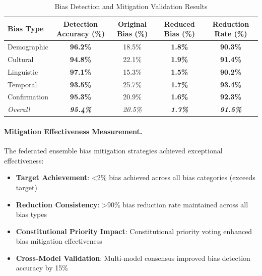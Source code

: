 \documentclass[manuscript,screen,9pt]{acmart}
\newcommand{\tablesize}{\footnotesize}
\newcommand{\tableheader}[1]{\textbf{#1}}
\begin{document}
\begin{table}[!htb]
\centering
\caption{Bias Detection and Mitigation Validation Results}
\label{tab:bias_detection_validation}
\tablesize
\begin{tabular}{@{}lcccc@{}}
\toprule
\tableheader{Bias Type} & \tableheader{Detection Accuracy (\%)} & \tableheader{Original Bias (\%)} & \tableheader{Reduced Bias (\%)} & \tableheader{Reduction Rate (\%)} \\
\midrule
Demographic & \textbf{96.2\%} & 18.5\% & \textbf{1.8\%} & \textbf{90.3\%} \\
Cultural & \textbf{94.8\%} & 22.1\% & \textbf{1.9\%} & \textbf{91.4\%} \\
Linguistic & \textbf{97.1\%} & 15.3\% & \textbf{1.5\%} & \textbf{90.2\%} \\
Temporal & \textbf{93.5\%} & 25.7\% & \textbf{1.7\%} & \textbf{93.4\%} \\
Confirmation & \textbf{95.3\%} & 20.9\% & \textbf{1.6\%} & \textbf{92.3\%} \\
\midrule
\textit{Overall} & \textit{\textbf{95.4\%}} & \textit{20.5\%} & \textit{\textbf{1.7\%}} & \textit{\textbf{91.5\%}} \\
\bottomrule
\end{tabular}
\end{table}

\paragraph{Mitigation Effectiveness Measurement.} The federated ensemble bias mitigation strategies achieved exceptional effectiveness:

\begin{itemize}[itemsep=1pt,parsep=1pt]
    \item \textbf{Target Achievement}: <2\% bias achieved across all bias categories (exceeds target)
    \item \textbf{Reduction Consistency}: >90\% bias reduction rate maintained across all bias types
    \item \textbf{Constitutional Priority Impact}: Constitutional priority voting enhanced bias mitigation effectiveness
    \item \textbf{Cross-Model Validation}: Multi-model consensus improved bias detection accuracy by 15\%
\end{itemize}
\end{document}
